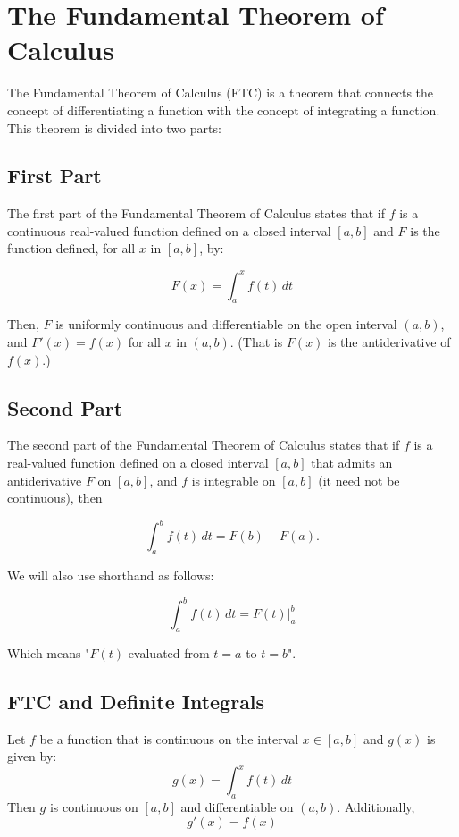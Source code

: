 \chapter{The Fundamental Theorem of Calculus}

The Fundamental Theorem of Calculus (FTC) is a theorem that connects the
concept of differentiating a function with the concept of integrating
a function. This theorem is divided into two parts:

\section{First Part}

The first part of the Fundamental Theorem of Calculus states that if
$f$ is a continuous real-valued function defined on a closed interval
$[a, b]$ and $F$ is the function defined, for all $x$ in $[a, b]$, by:

\begin{equation}
F(x) = \int_a^x f(t) \, dt
\end{equation}

Then, $F$ is uniformly continuous and differentiable on the open
interval $(a, b)$, and $F'(x) = f(x)$ for all $x$ in $(a, b)$.
(That is $F(x)$ is the antiderivative of $f(x)$.)

\section{Second Part}

The second part of the Fundamental Theorem of Calculus states that if
$f$ is a real-valued function defined on a closed interval $[a, b]$
that admits an antiderivative $F$ on $[a, b]$, and $f$ is integrable
on $[a, b]$ (it need not be continuous), then

\begin{equation}
\int_a^b f(t) \, dt = F(b) - F(a).
\end{equation}

We will also use shorthand as follows:

\begin{equation}
\int_a^b f(t)\,dt = F(t)|_a^b
\end{equation}

Which means "$F(t)$ evaluated from $t=a$ to $t=b$". 

\section{FTC and Definite Integrals}
Let $f$ be a function that is continuous on the interval $x \in \left[ a, b \right]$ and $g(x)$ is given by:
$$g(x) = \int_a^x f(t)\,dt$$
Then $g$ is continuous on $\left[a, b \right]$ and differentiable on $\left( a, b \right)$. Additionally, 
$$g'(x) = f(x)$$

